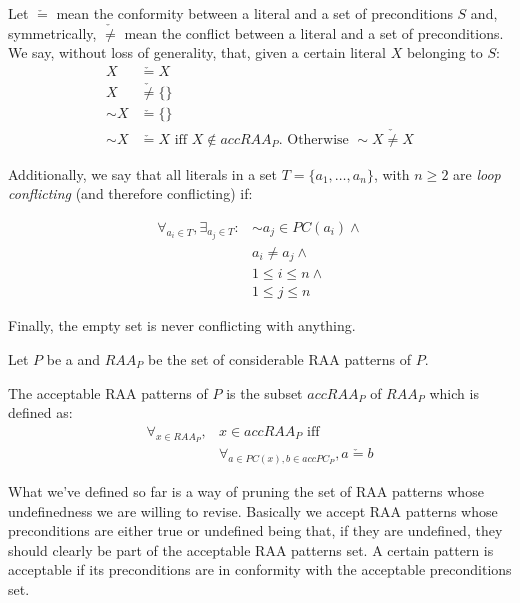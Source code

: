 \begin{definition}
\label{def:conformity}
Let $\check{=}$ mean the conformity between a literal and a set of preconditions $S$ and, symmetrically, $\check{\neq}$ mean the conflict between a literal and a set of preconditions. We say, without loss of generality, that, given a certain literal $X$ belonging to $S$:
\begin{align*}
X & \check{=} X 					 \\
X & \check{\neq} \{\} 		 \\
\sim X & \check{=} \{\} 	 \\
\sim X & \check{=} X 			 \text{ iff } X \notin accRAA_{P}. \text{ Otherwise }\sim X \check{\neq} X
\end{align*}

Additionally, we say that all literals in a set $T=\{a_{1},\ldots,a_{n}\}$, with $n\geq 2$ are \emph{loop conflicting} (and therefore conflicting) if:

\begin{align*}
\forall_{a_{i}\in T},\exists_{a_{j}\in T}: & \sim a_{j} \in PC(a_{i}) \wedge\\
																					 & a_{i}\neq a_{j} \wedge\\
																					 & 1\leq i\leq n \wedge\\
																					 & 1\leq j\leq n
\end{align*}


Finally, the empty set is never conflicting with anything.
\end{definition}


\begin{definition}
Let $P$ be a \NLP and $RAA_{P}$ be the set of considerable RAA patterns of $P$. 

The acceptable RAA patterns of $P$ is the subset $accRAA_{P}$ of $RAA_{P}$ which is defined as:
\begin{align*}
\forall_{x\in RAA_{P}}, & x\in accRAA_{P}\text{ iff }\\
                        & \forall_{a\in PC(x),b\in accPC_{P}}, a\check{=}b 
\end{align*}

\end{definition}

What we've defined so far is a way of pruning the set of RAA patterns whose undefinedness we are willing to revise. Basically we accept RAA patterns whose preconditions are either true or undefined being that, if they are undefined, they should clearly be part of the acceptable RAA patterns set. A certain pattern is acceptable if its preconditions are in conformity with the acceptable preconditions set. 

